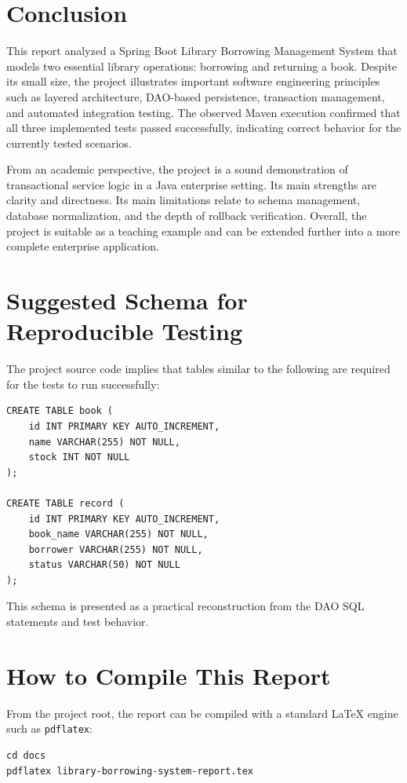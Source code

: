 \documentclass[12pt,a4paper]{report}
\begin{document}
\chapter{Conclusion}
This report analyzed a Spring Boot Library Borrowing Management System that models two essential library operations: borrowing and returning a book. Despite its small size, the project illustrates important software engineering principles such as layered architecture, DAO-based persistence, transaction management, and automated integration testing. The observed Maven execution confirmed that all three implemented tests passed successfully, indicating correct behavior for the currently tested scenarios.

From an academic perspective, the project is a sound demonstration of transactional service logic in a Java enterprise setting. Its main strengths are clarity and directness. Its main limitations relate to schema management, database normalization, and the depth of rollback verification. Overall, the project is suitable as a teaching example and can be extended further into a more complete enterprise application.

\appendix

\chapter{Suggested Schema for Reproducible Testing}
The project source code implies that tables similar to the following are required for the tests to run successfully:

\begin{lstlisting}[style=reportcode]
CREATE TABLE book (
    id INT PRIMARY KEY AUTO_INCREMENT,
    name VARCHAR(255) NOT NULL,
    stock INT NOT NULL
);

CREATE TABLE record (
    id INT PRIMARY KEY AUTO_INCREMENT,
    book_name VARCHAR(255) NOT NULL,
    borrower VARCHAR(255) NOT NULL,
    status VARCHAR(50) NOT NULL
);
\end{lstlisting}

This schema is presented as a practical reconstruction from the DAO SQL statements and test behavior.

\chapter{How to Compile This Report}
From the project root, the report can be compiled with a standard LaTeX engine such as \texttt{pdflatex}:

\begin{lstlisting}[style=reportcode]
cd docs
pdflatex library-borrowing-system-report.tex
\end{lstlisting}
\end{document}
